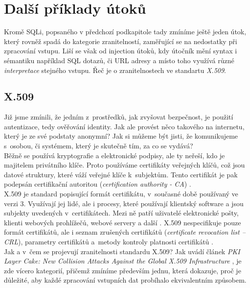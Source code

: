 \section{Další příklady útoků} \label{sec:3:attacks}
Kromě SQLi, popsaného v předchozí podkapitole tady zmíníme ještě jeden útok, který rovněž spadá do kategorie zranitelností, zaměřující se
na nedostatky při zpracování vstupu. Liší se však od injection útoků, kdy útočník mění syntax i sémantiku například SQL dotazů, či URL
adresy a místo toho využívá různé \textit{interpretace} stejného vstupu. Řeč je o zranitelnostech ve standartu \textit{X.509}.

\subsection{X.509} \label{subsec:3:x509}
Již jsme zmínili, že jedním z~prostředků, jak zvyšovat bezpečnost, je použití autentizace, tedy ověřování identity. Jak ale provést něco takového 
na internetu, který je ze své podstaty anonymní? Jak si můžeme být jisti, že komunikujeme s~osobou, či systémem, který je skutečně tím, za co se vydává? \\

Běžně se používá kryptografie a elektronické podpisy, ale ty neřeší, kdo je majitelem privátního klíče. Proto používáme certifikáty veřejných klíčů, 
což jsou datové struktury, které váží veřejné klíče k~subjektům. Tento certifikát je pak podepsán certifikační autoritou 
(\textit{certification authority - CA}) \cite[str. 9-10]{RFC:X509}. \\

X.509 je standard popisující formát certifikátu, v~současné době používaný ve verzi 3. \mbox{Využívají} jej lidé, ale i procesy, které používají 
klientský software a jsou subjekty uvedených v~certifikátech. Mezi ně patří uživatelé elektronické pošty, klienti webových prohlížečů, webové 
servery a další \cite[str. 9-10]{RFC:X509}. X.509 nespecifikuje pouze formát certifikátů, ale i seznam zrušených certifikátů 
(\textit{certificate revocation list – CRL}), parametry certifikátů a~metody kontroly platnosti certifikátů \cite[str. 130]{Slovnik2015}. \\

Jak a v~čem se projevují zranitelnosti standardu X.509? Jak uvádí článek \textit{PKI Layer Cake: New Collision Attacks Against the Global X.509 Infrastructure} 
\cite[str. X]{Kaminsky2010}, je zde vícero kategorií, přičemž zmíníme především jednu, která dokazuje, proč je důležité, aby každé zpracování vstupních
dat probíhalo ekvivalentním způsobem. \\

